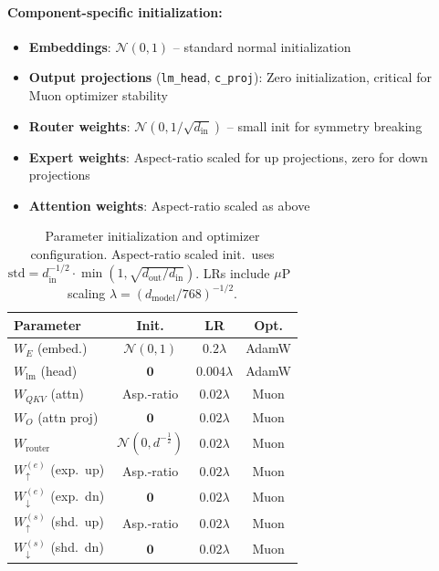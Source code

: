 \documentclass{article}
\theoremstyle{plain}
\theoremstyle{definition}
\theoremstyle{remark}
\begin{document}
\paragraph{Component-specific initialization:}
\begin{itemize}
    \item \textbf{Embeddings}: $\mathcal{N}(0, 1)$ -- standard normal initialization
    \item \textbf{Output projections} (\texttt{lm\_head}, \texttt{c\_proj}): Zero initialization, critical for Muon optimizer stability
    \item \textbf{Router weights}: $\mathcal{N}(0, 1/\sqrt{d_{\text{in}}})$ -- small init for symmetry breaking
    \item \textbf{Expert weights}: Aspect-ratio scaled for up projections, zero for down projections
    \item \textbf{Attention weights}: Aspect-ratio scaled as above
\end{itemize}

\begin{table}[h]
\centering
\caption{Parameter initialization and optimizer configuration. Aspect-ratio scaled init.\ uses $\text{std} = d_{\text{in}}^{-1/2} \cdot \min(1, \sqrt{d_{\text{out}}/d_{\text{in}}})$. LRs include $\mu$P~\cite{yang2022mup} scaling $\lambda = (d_{\text{model}}/768)^{-1/2}$.}
\label{tab:param_init_lr}
\footnotesize
\begin{tabular}{@{}lccc@{}}
\toprule
\textbf{Parameter} & \textbf{Init.} & \textbf{LR} & \textbf{Opt.} \\
\midrule
$W_E$ (embed.) & $\mathcal{N}(0, 1)$ & $0.2\lambda$ & AdamW \\
$W_{\text{lm}}$ (head) & $\mathbf{0}$ & $0.004\lambda$ & AdamW \\
\midrule
$W_{QKV}$ (attn) & Asp.-ratio & $0.02\lambda$ & Muon \\
$W_O$ (attn proj) & $\mathbf{0}$ & $0.02\lambda$ & Muon \\
\midrule
$W_{\text{router}}$ & $\mathcal{N}(0, d^{-\frac{1}{2}})$ & $0.02\lambda$ & Muon \\
$W^{(e)}_{\uparrow}$ (exp.\ up) & Asp.-ratio & $0.02\lambda$ & Muon \\
$W^{(e)}_{\downarrow}$ (exp.\ dn) & $\mathbf{0}$ & $0.02\lambda$ & Muon \\
$W^{(s)}_{\uparrow}$ (shd.\ up) & Asp.-ratio & $0.02\lambda$ & Muon \\
$W^{(s)}_{\downarrow}$ (shd.\ dn) & $\mathbf{0}$ & $0.02\lambda$ & Muon \\
\bottomrule
\end{tabular}
\end{table}
\end{document}
